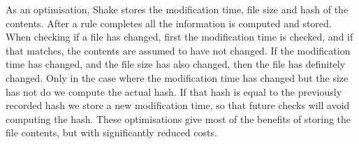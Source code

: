 As an optimisation, Shake stores the modification time, file size and hash of the contents. After a rule completes all the information is computed and stored. When checking if a file has changed, first the modification time is checked, and if that matches, the contents are assumed to have not changed. If the modification time has changed, and the file size has also changed, then the file has definitely changed. Only in the case where the modification time has changed but the size has not do we compute the actual hash. If that hash is equal to the previously recorded hash we store a new modification time, so that future checks will avoid computing the hash. These optimisations give most of the benefits of storing the file contents, but with significantly reduced costs.
